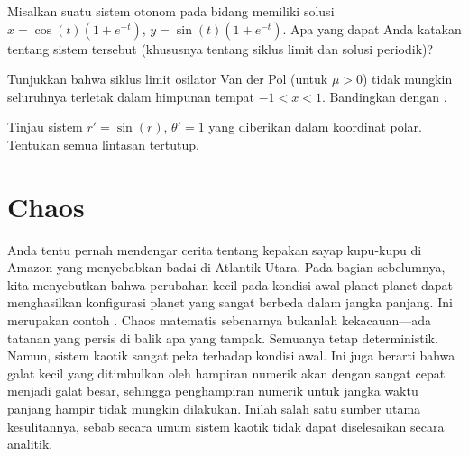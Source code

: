 \begin{exercise}
Misalkan suatu sistem otonom pada bidang memiliki solusi
$x=\cos(t)(1+e^{-t})$, $y=\sin(t)(1+e^{-t})$. Apa yang dapat Anda katakan
tentang sistem tersebut (khususnya tentang siklus limit dan solusi periodik)?
\end{exercise}

\begin{exercise}
Tunjukkan bahwa siklus limit osilator Van der Pol (untuk $\mu > 0$)
tidak mungkin seluruhnya terletak dalam himpunan tempat $-1 < x < 1$.
Bandingkan dengan .
\end{exercise}

\begin{exercise}
Tinjau sistem $r' = \sin(r)$, $\theta' = 1$ yang diberikan dalam koordinat
polar. Tentukan semua lintasan tertutup.
\end{exercise}



\sectionnewpage
\section{Chaos} \label{sec:chaos}



Anda tentu pernah mendengar cerita tentang kepakan sayap kupu-kupu di
Amazon yang menyebabkan badai di Atlantik Utara.  Pada bagian sebelumnya,
kita menyebutkan bahwa perubahan kecil pada kondisi awal planet-planet dapat
menghasilkan konfigurasi planet yang sangat berbeda dalam jangka panjang.
Ini merupakan contoh
\emph{}.
Chaos matematis sebenarnya bukanlah kekacauan---ada tatanan yang persis di
balik apa yang tampak.  Semuanya tetap deterministik.  Namun, sistem kaotik
sangat peka terhadap kondisi awal.  Ini juga berarti bahwa galat kecil yang
ditimbulkan oleh hampiran numerik akan dengan sangat cepat menjadi galat
besar, sehingga penghampiran numerik untuk jangka waktu panjang hampir tidak
mungkin dilakukan.  Inilah salah satu sumber utama kesulitannya, sebab
secara umum sistem kaotik tidak dapat diselesaikan secara analitik.

